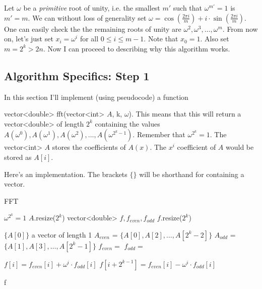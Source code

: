 Let $\omega$ be a \emph{primitive} root of unity, i.e. the smallest $m'$ such that $\omega^{m'} = 1$ is $m' = m.$ We can without loss of generality set $\omega = \cos\left(\frac{2\pi i}{m}\right) + i \cdot \sin\left(\frac{2\pi i}{m} \right).$ One can easily check the the remaining roots of unity are $\omega^2, \omega^3, \dots, \omega^m.$ From now on, let's just set $x_i = \omega^i$ for all $0 \le i \le m-1.$ Note that $x_0 = 1.$ Also set $m = 2^k > 2n.$ Now I can proceed to describing why this algorithm works.

\subsection{Algorithm Specifics: Step 1}

In this section I'll implement (using pseudocode) a function 

vector<double> fft(vector<int> $A$, k, $\omega$). This means that this will return a vector<double> of length $2^k$ containing the values $A(\omega^0), A(\omega^1), A(\omega^2), \dots, A(\omega^{2^k-1}).$ Remember that $\omega^{2^k} = 1.$ The vector<int> $A$ stores the coefficients of $A(x)$. The $x^i$ coefficient of $A$ would be stored as $A[i].$

Here's an implementation. The brackets $\{ \}$ will be shorthand for containing a vector.

\begin{algorithm}[H]
\caption{FFT}
\begin{algorithmic}
 \Comment $\omega^{2^k} = 1$
	\State $A$.resize($2^k$)
	\State vector<double> $f, f_{even}, f_{odd}$
	\State $f$.resize($2^k$)
	
		\State \Return $ \{A[0] \}$ \Comment a vector of length 1
    \EndIf
    \State $A_{even}$ = $ \{A[0], A[2], \dots, A[2^k-2] \}$
    \State $A_{odd}$ = $ \{A[1], A[3], \dots, A[2^k-1] \}$
    \State $f_{even} = $ 
    \State $f_{odd} = $ 
    
    	\State $f[i] = f_{even}[i] + \omega^i \cdot f_{odd}[i]$
	\State $f[i+2^{k-1}] = f_{even}[i] - \omega^i \cdot f_{odd}[i]$

	\EndFor

\Return f

\EndFunction

\end{algorithmic}
\end{algorithm}

